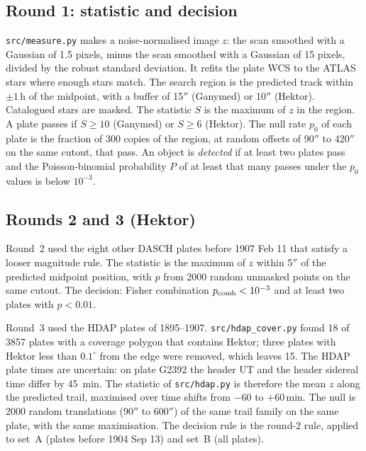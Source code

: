\documentclass[11pt]{article}
\newcommand{\as}{$''$}
\begin{document}
\subsection{Round 1: statistic and decision}
\texttt{src/measure.py} makes a noise-normalised image $z$: the scan smoothed with a Gaussian of 1.5 pixels, minus the scan smoothed with a Gaussian of 15 pixels, divided by the robust standard deviation. It refits the plate WCS to the ATLAS stars where enough stars match. The search region is the predicted track within $\pm1$\,h of the midpoint, with a buffer of 15\as{} (Ganymed) or 10\as{} (Hektor). Catalogued stars are masked. The statistic $S$ is the maximum of $z$ in the region. A plate passes if $S\ge10$ (Ganymed) or $S\ge6$ (Hektor). The null rate $p_0$ of each plate is the fraction of 300 copies of the region, at random offsets of 90\as{} to 420\as{} on the same cutout, that pass. An object is \emph{detected} if at least two plates pass and the Poisson-binomial probability $P$ of at least that many passes under the $p_0$ values is below $10^{-3}$.

\subsection{Rounds 2 and 3 (Hektor)}
Round~2 used the eight other DASCH plates before 1907 Feb 11 that satisfy a looser magnitude rule. The statistic is the maximum of $z$ within 5\as{} of the predicted midpoint position, with $p$ from 2000 random unmasked points on the same cutout. The decision: Fisher combination $p_{\rm comb}<10^{-3}$ and at least two plates with $p<0.01$.

Round~3 used the HDAP plates of 1895--1907. \texttt{src/hdap\_cover.py} found 18 of 3857 plates with a coverage polygon that contains Hektor; three plates with Hektor less than $0.1^\circ$ from the edge were removed, which leaves 15. The HDAP plate times are uncertain: on plate G2392 the header UT and the header sidereal time differ by 45~min. The statistic of \texttt{src/hdap.py} is therefore the mean $z$ along the predicted trail, maximised over time shifts from $-60$ to $+60$\,min. The null is 2000 random translations (90\as{} to 600\as{}) of the same trail family on the same plate, with the same maximisation. The decision rule is the round-2 rule, applied to set~A (plates before 1904 Sep 13) and set~B (all plates).
\end{document}
